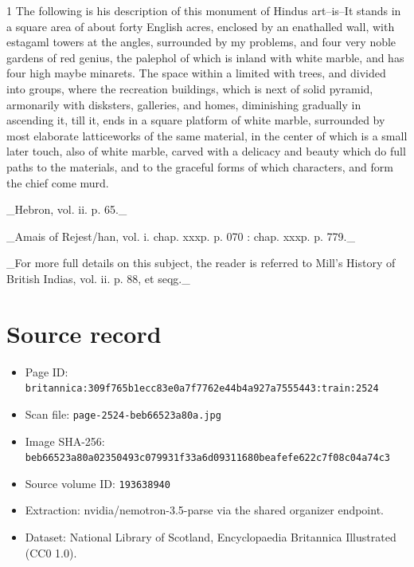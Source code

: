 \documentclass{article}
\begin{document}
1 The following is his description of this monument of Hindus art--is--It stands in a square area of about forty English acres, enclosed by an enathalled wall, with estagaml towers at the angles, surrounded by my problems, and four very noble gardens of red genius, the palephol of which is inland with white marble, and has four high maybe minarets. The space within a limited with trees, and divided into groups, where the recreation buildings, which is next of solid pyramid, armonarily with disksters, galleries, and homes, diminishing gradually in ascending it, till it, ends in a square platform of white marble, surrounded by most elaborate latticeworks of the same material, in the center of which is a small later touch, also of white marble, carved with a delicacy and beauty which do full paths to the materials, and to the graceful forms of which characters, and form the chief come murd.

\_Hebron, vol. ii. p. 65.\_

\_Amais of Rejest/han, vol. i. chap. xxxp. p. 070 : chap. xxxp. p. 779.\_

\_For more full details on this subject, the reader is referred to Mill’s History of British Indias, vol. ii. p. 88, et seqg.\_

\section*{Source record}
\begin{itemize}
\item Page ID: \texttt{britannica:309f765b1ecc83e0a7f7762e44b4a927a7555443:train:2524}
\item Scan file: \texttt{page-2524-beb66523a80a.jpg}
\item Image SHA-256: \texttt{beb66523a80a02350493c079931f33a6d09311680beafefe622c7f08c04a74c3}
\item Source volume ID: \texttt{193638940}
\item Extraction: nvidia/nemotron-3.5-parse via the shared organizer endpoint.
\item Dataset: National Library of Scotland, Encyclopaedia Britannica Illustrated (CC0 1.0).
\end{itemize}
\end{document}
